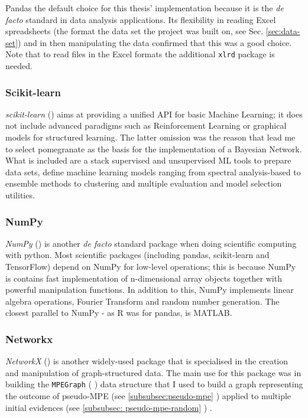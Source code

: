Pandas the default choice for this thesis' implementation because it is the \textit{de facto} standard in data analysis applications.
Its flexibility in reading Excel spreadsheets (the format the data set the project was built on, see Sec. \ref{sec:data-set}) and in then manipulating the data confirmed that this was a good choice.
Note that to read files in the Excel formats the additional \texttt{xlrd} package is needed.

\subsubsection{Scikit-learn}
\textit{scikit-learn} (\cite{scikitlearn}) aims at providing a unified API for basic Machine Learning; it does not include advanced paradigms such as Reinforcement Learning or graphical models for structured learning.
The latter omission was the reason that lead me to select pomegranate as the basis for the implementation of a Bayesian Network.
What is included are a stack supervised and unsupervised ML tools to prepare data sets, define machine learning models ranging from spectral analysis-based to ensemble methods to clustering and multiple evaluation and model selection utilities.

\subsubsection{NumPy}
\textit{NumPy} (\cite{numpy}) is another \textit{de facto} standard package when doing scientific computing with python.
Most scientific packages (including pandas, scikit-learn and TensorFlow) depend on NumPy for low-level operations; this is because NumPy is contains fast implementation of n-dimensional array objects together with powerful manipulation functions.
In addition to this, NumPy implements linear algebra operations, Fourier Transform and random number generation.
The closest parallel to NumPy - as R was for pandas, is MATLAB.

\subsubsection{Networkx}
\textit{NetworkX} (\cite{networkx}) is another widely-used package that is specialised in the creation and manipulation of graph-structured data.
The main use for this package was in building the \texttt{MPEGraph} (  ) data structure that I used to build a graph representing the outcome of pseudo-MPE (see \ref{subsubsec:pseudo-mpe} ) applied to multiple initial evidences (see \ref{subsubsec: pseudo-mpe-random} ) .


